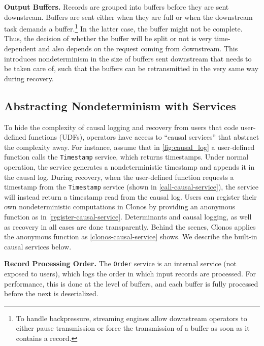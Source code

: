 \documentclass[sigconf]{acmart}
\newcommand{\para}[1]{\vspace{1mm}\noindent\textbf{#1.}}
\begin{document}
\para{Output Buffers} Records are grouped into buffers before they are sent downstream. Buffers are sent either when they are full or when the downstream task demands a buffer.\footnote{To handle backpressure, streaming engines allow  downstream operators to either pause transmission or force the transmission of a buffer as soon as it contains a record.} In the latter case, the buffer might not be complete. Thus, the decision of whether the buffer will be split or not is very time-dependent and also depends on the request coming from downstream. This introduces nondeterminism in the size of buffers sent downstream that needs to be taken care of, such that the buffers can be retransmitted in the very same way during recovery.





\subsection{Abstracting Nondeterminism with Services}
\label{sec:determinants}

To hide the complexity of causal logging and recovery from users that code user-defined functions (UDFs), operators have access to ``causal services'' that abstract the complexity away. For instance, assume that in \autoref{fig:causal_log} a user-defined function calls the \texttt{Timestamp} service, which returns timestamps. 
Under normal operation, the service generates a nondeterministic timestamp and appends it in the causal log.
During recovery, when the user-defined function requests a timestamp from the \texttt{Timestamp} service (shown in \autoref{call-causal-service}), the service will instead return a timestamp read from the causal log. Users can register their own nondeterministic computations in Clonos by providing an anonymous function as in \autoref{register-causal-service}. Determinants and causal logging, as well as recovery in all cases are done transparently. Behind the scenes, Clonos applies the anonymous function as \autoref{clonos-causal-service} shows. We describe the built-in causal services below.

\para{Record Processing Order} The \texttt{Order} service is an internal service (not exposed to users), which logs the order in which input records are processed. 
For performance, this is done at the level of buffers, and each buffer is fully processed before the next is deserialized.
\end{document}

